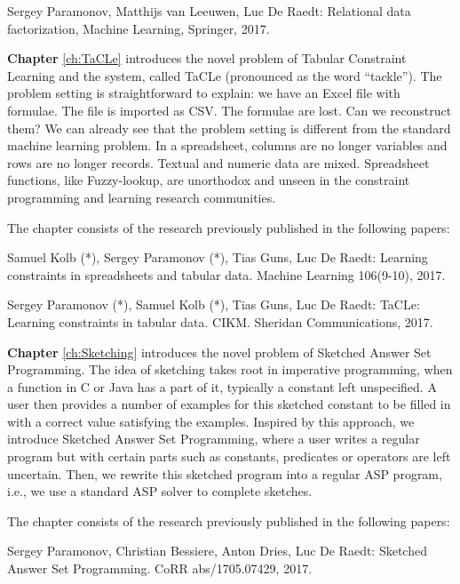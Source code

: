 \begin{addmargin}[2em]{2em}

Sergey Paramonov,  Matthijs van Leeuwen, Luc De Raedt: Relational data
factorization, Machine Learning, Springer, 2017.

\end{addmargin}



\textbf{Chapter} \ref{ch:TaCLe} introduces  the novel problem of
Tabular Constraint Learning and the system, called TaCLe (pronounced
as the word ``tackle''). The problem setting is straightforward to
explain: we have an Excel file with formulae. The file is imported as
CSV. The formulae are lost. Can we reconstruct them? We can already 
see that the problem setting is different from the standard machine
learning problem. In a spreadsheet, columns are no longer variables
and rows are no longer records. Textual and numeric data are mixed.
Spreadsheet functions, like Fuzzy-lookup, are unorthodox and unseen in
the constraint programming and learning research communities.

The chapter consists of the research previously published in the following papers:

\begin{addmargin}[2em]{2em}
Samuel Kolb (*), Sergey Paramonov (*), Tias Guns, Luc De Raedt:
  Learning constraints in spreadsheets and tabular data. Machine
  Learning 106(9-10), 2017.


Sergey Paramonov (*), Samuel Kolb (*), Tias Guns, Luc De Raedt:
TaCLe: Learning constraints in tabular data. CIKM. Sheridan
Communications, 2017.
\end{addmargin}


\textbf{Chapter} \ref{ch:Sketching} introduces the novel problem of
Sketched Answer Set Programming. The idea of sketching takes root in
imperative programming, when a function in C or Java has a part of it,
typically a constant left unspecified. A user then provides a number
of examples for this sketched constant to be filled in with a
correct value satisfying the examples. Inspired by this approach, we
introduce Sketched Answer Set Programming, where a user writes a
regular program but with certain parts such as constants, predicates
or operators are left uncertain. Then, we rewrite this sketched
program into a regular ASP program, i.e., we use a standard ASP solver
to complete sketches.


The chapter consists of the research previously published in the following papers:
\begin{addmargin}[2em]{2em}
  Sergey Paramonov, Christian Bessiere, Anton Dries, Luc De Raedt:
  Sketched Answer Set Programming. CoRR abs/1705.07429, 2017.
\end{addmargin}


